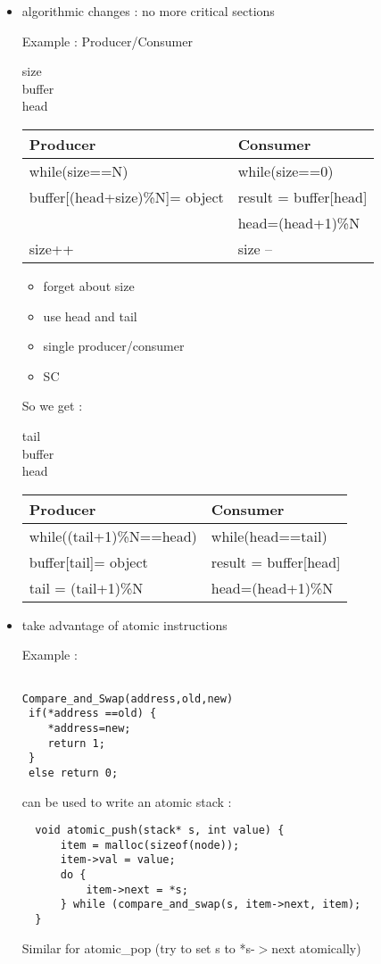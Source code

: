 \begin{itemize}
  \item algorithmic changes : no more critical sections
  
  Example : Producer/Consumer
  
  \begin{center}
size\\buffer\\head

      \begin{tabular}{l|l}
        Producer & Consumer\\
		\hline
        while(size==N) {} & while(size==0) {}\\
        buffer[(head+size)\%N]= object & result = buffer[head]\\
         & head=(head+1)\%N \\        
        size++ & size -- \\
      \end{tabular}
    \end{center}
  
  
  \begin{itemize}
    \item forget about size
    \item use head and tail
    \item single producer/consumer
    \item SC
  \end{itemize}

So we get :
\begin{center}
tail\\buffer\\head

      \begin{tabular}{l|l}
        Producer & Consumer\\
		\hline
        while((tail+1)\%N==head) {} & while(head==tail) {}\\
        buffer[tail]= object & result = buffer[head]\\
        tail = (tail+1)\%N & head=(head+1)\%N \\        
      \end{tabular}
    \end{center}    

\item take advantage of atomic instructions

Example : 
\begin{verbatim}

Compare_and_Swap(address,old,new)
 if(*address ==old) {
    *address=new;
    return 1;
 }
 else return 0;
\end{verbatim}
can be used to write an atomic stack :

\begin{verbatim}
  void atomic_push(stack* s, int value) {
      item = malloc(sizeof(node));
      item->val = value;
      do {
          item->next = *s;
      } while (compare_and_swap(s, item->next, item);
  }
\end{verbatim}

Similar for atomic\_pop (try to set s to *s-$>$next atomically)

\end{itemize}

